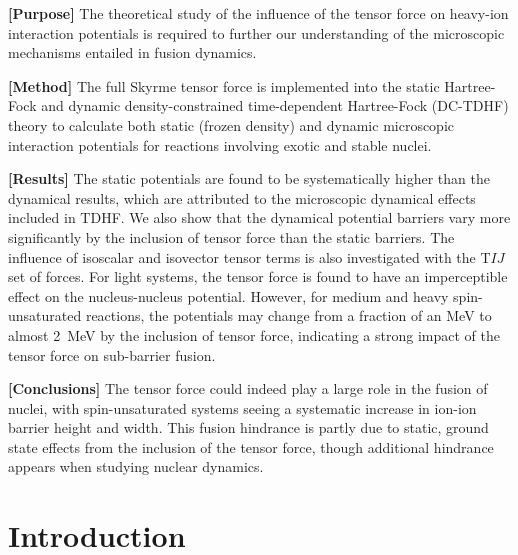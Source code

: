 		{\bf [Purpose]}
		The theoretical study of the influence of the tensor force on heavy-ion interaction potentials is required to further our
		understanding of the microscopic mechanisms entailed in fusion dynamics.
		
		{\bf [Method]}
The full Skyrme tensor force is implemented into the static Hartree-Fock and dynamic density-constrained time-dependent Hartree-Fock
(DC-TDHF) theory
to calculate both static (frozen density) and dynamic microscopic interaction potentials for reactions involving exotic and stable nuclei.
		
		{\bf [Results]}
The static potentials are found to be systematically higher than the dynamical results, which are attributed to the microscopic dynamical effects included in TDHF.
We also show that the dynamical potential barriers vary more significantly by the inclusion of tensor force than the static barriers.
The influence of isoscalar and isovector tensor terms is also investigated with the T$IJ$ set of forces.
For light systems, the tensor force is found to have an imperceptible effect on the nucleus-nucleus potential. However, for medium and heavy spin-unsaturated reactions,
the potentials may change from a fraction of an MeV to almost 2~MeV by the inclusion of tensor force, indicating a strong impact of the tensor force on sub-barrier fusion.
		
		{\bf [Conclusions]}
		The tensor force could indeed play a large role in the fusion of nuclei, with spin-unsaturated systems seeing a systematic increase in ion-ion barrier height and width. This fusion hindrance is partly due to static, ground state effects from the inclusion of the tensor force, though additional hindrance appears when studying nuclear dynamics.







\section{Introduction}
\label{introduction}

